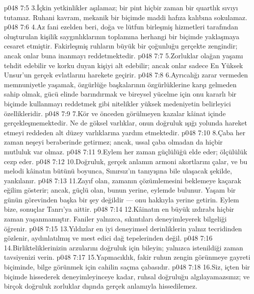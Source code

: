 \vs p048 7:5 3.\bibnobreakspace İçkin yetkinlikler aşılamaz; bir pint hiçbir zaman bir quartlık sıvıyı tutamaz. Ruhani kavram, mekanik bir biçimde maddi hafıza kalıbına sokulamaz.
\vs p048 7:6 4.\bibnobreakspace Az fani ezelden beri, doğa ve lütfun birleşmiş hizmetleri tarafından oluşturulan kişilik saygınlıklarının toplamına herhangi bir biçimde yaklaşmaya cesaret etmiştir. Fakirleşmiş ruhların büyük bir çoğunluğu gerçekte zengindir; ancak onlar buna inanmayı reddetmektedir.
\vs p048 7:7 5.\bibnobreakspace Zorluklar olağan yaşamı tehdit edebilir ve korku duyan kişiyi alt edebilir; ancak onlar sadece En Yüksek Unsur’un gerçek evlatlarını harekete geçirir.
\vs p048 7:8 6.\bibnobreakspace Ayrıcalığı zarar vermeden memnuniyetle yaşamak, özgürlüğe başkalarının özgürlüklerine karşı gelmeden sahip olmak, gücü elinde barındırmak ve bireysel yücelme için onu kararlı bir biçimde kullanmayı reddetmek gibi nitelikler yüksek medeniyetin belirleyici özellikleridir.
\vs p048 7:9 7.\bibnobreakspace Kör ve önceden görülmeyen kazalar kâinat içinde gerçekleşmemektedir. Ne de göksel varlıklar, onun doğruluk ışığı yolunda hareket etmeyi reddeden alt düzey varlıklarına yardım etmektedir.
\vs p048 7:10 8.\bibnobreakspace Çaba her zaman neşeyi beraberinde getirmez; ancak, ussal çaba olmadan da hiçbir mutluluk var olmaz.
\vs p048 7:11 9.\bibnobreakspace Eylem her zaman güçlülüğü elde eder; ölçülülük cezp eder.
\vs p048 7:12 10.\bibnobreakspace Doğruluk, gerçek anlamın armoni akortlarını çalar, ve bu melodi kâinatın bütünü boyunca, Sınırsız’ın tanıyışına bile ulaşacak şekilde, yankılanır.
\vs p048 7:13 11.\bibnobreakspace Zayıf olan, zamanın çözümlemesini beklemeye kaçarak eğilim gösterir; ancak, güçlü olan, bunun yerine, eylemde bulunur. Yaşam bir günün görevinden başka bir şey değildir --- onu hakkıyla yerine getirin. Eylem bize, sonuçlar Tanrı’ya aittir.
\vs p048 7:14 12.\bibnobreakspace Kâinatın en büyük ızdırabı hiçbir zaman yaşanmamıştır. Faniler yalnızca, sıkıntıları deneyimleyerek bilgeliği öğrenir.
\vs p048 7:15 13.\bibnobreakspace Yıldızlar en iyi deneyimsel derinliklerin yalnız tecridinden gözlenir, aydınlatılmış ve mest edici dağ tepelerinden değil.
\vs p048 7:16 14.\bibnobreakspace Birlikteliklerinizin arzularını doğruluk için bileyin; yalnızca istenildiği zaman tavsiyenizi verin.
\vs p048 7:17 15.\bibnobreakspace Yapmacıklık, fakir ruhun zengin görünmeye gayreti biçiminde, bilge görünmek için cahilin saçma çabasıdır.
\vs p048 7:18 16.\bibnobreakspace Siz, içten bir biçimde hissederek deneyimleyinceye kadar, ruhsal doğruluğu algılayamazsınız; ve birçok doğruluk zorluklar dışında gerçek anlamıyla hissedilemez.
